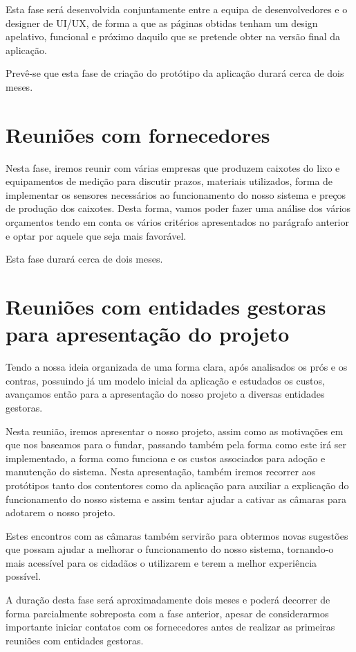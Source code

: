 \documentclass[11pt, a4paper, oneside]{book}
\begin{document}
Esta fase será desenvolvida conjuntamente entre a equipa de desenvolvedores e o designer de UI/UX, de forma a que as páginas obtidas tenham um design apelativo, funcional e próximo daquilo que se pretende obter na versão final da aplicação.

Prevê-se que esta fase de criação do protótipo da aplicação durará cerca de dois meses.

\section{Reuniões com fornecedores}

Nesta fase, iremos reunir com várias empresas que produzem caixotes do lixo e equipamentos de medição para discutir prazos, materiais utilizados, forma de implementar os sensores necessários ao funcionamento do nosso sistema e preços de produção dos caixotes.
Desta forma, vamos poder fazer uma análise dos vários orçamentos tendo em conta os vários critérios apresentados no parágrafo anterior e optar por aquele que seja mais favorável.

Esta fase durará cerca de dois meses.

\section{Reuniões com entidades gestoras para apresentação do projeto}

Tendo a nossa ideia organizada de uma forma clara, após analisados os prós e os contras, possuindo já um modelo inicial da aplicação e estudados os custos, avançamos então para a apresentação do nosso projeto a diversas entidades gestoras.

Nesta reunião, iremos apresentar o nosso projeto, assim como as motivações em que nos baseamos para o fundar, passando também pela forma como este irá ser implementado, a forma como funciona e os custos associados para adoção e manutenção do sistema. Nesta apresentação, também iremos recorrer aos protótipos tanto dos contentores como da aplicação para auxiliar a explicação do funcionamento do nosso sistema e assim tentar ajudar a cativar as câmaras para adotarem o nosso projeto.

Estes encontros com as câmaras também servirão para obtermos novas sugestões que possam ajudar a melhorar o funcionamento do nosso sistema, tornando-o mais acessível para os cidadãos o utilizarem e terem a melhor experiência possível.

A duração desta fase será aproximadamente dois meses e poderá decorrer de forma parcialmente sobreposta com a fase anterior, apesar de considerarmos importante iniciar contatos com os fornecedores antes de realizar as primeiras reuniões com entidades gestoras. 
\end{document}
